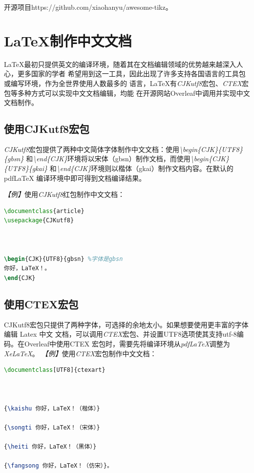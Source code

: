 \begin{tcolorbox}[colback=red!5!white, colframe=red!50!black, title=参考资料]
    开源项目https://github.com/xiaohanyu/awesome-tikz。
\end{tcolorbox}

\section{\LaTeX 制作中文文档}
LaTeX最初只提供英文的编译环境，随着其在文档编辑领域的优势越来越深入人心，更多国家的学者
希望用到这一工具，因此出现了许多支持各国语言的工具包或编写环境，作为全世界使用人数最多的
语言，LaTeX有\emph{CJKutf8}宏包、\emph{CTEX}宏包等多种方式可以实现中文文档编辑，均能
在开源网站Overleaf中调用并实现中文文档制作。

\subsection{使用CJKutf8宏包}
\emph{CJKutf8}宏包提供了两种中文简体字体制作中文文档：使用\emph{\textbackslash begin\{CJK\}\{UTF8\}\{gbsn\}}
和\emph{\textbackslash end\{CJK\}}环境将以宋体（gbsn）制作文档，而使用\emph{\textbackslash begin\{CJK\}\{UTF8\}\{gkai\}}
和\emph{\textbackslash end\{CJK\}}环境则以楷体（gkai）制作文档内容。在默认的pdfLaTeX
编译环境中即可得到文档编译结果。

\emph{【例】}使用\emph{CJKutf8}红包制作中文文档：
\begin{lstlisting}[language=TeX, caption={CJKutf8示例}]
\documentclass{article}
\usepackage{CJKutf8}



\begin{CJK}{UTF8}{gbsn} %字体是gbsn
你好，LaTeX！。
\end{CJK}


\end{lstlisting}

\subsection{使用CTEX宏包}
CJKutf8宏包只提供了两种字体，可选择的余地太小。如果想要使用更丰富的字体编辑 Latex 中文
文档，可以调用\emph{CTEX}宏包、并设置UTF8选项使其支持utf-8编码。在Overleaf中使用CTEX
宏包时，需要先将编译环境从\emph{pdfLaTeX}调整为\emph{XeLaTeX}。
\emph{【例】}使用\emph{CTEX}宏包制作中文文档：
\begin{lstlisting}[language=TeX, caption={CTEX示例}]
\documentclass[UTF8]{ctexart}



{\kaishu 你好，LaTeX！（楷体）}

{\songti 你好，LaTeX！（宋体）}

{\heiti 你好，LaTeX！（黑体）}

{\fangsong 你好，LaTeX！（仿宋）}。


\end{lstlisting}

